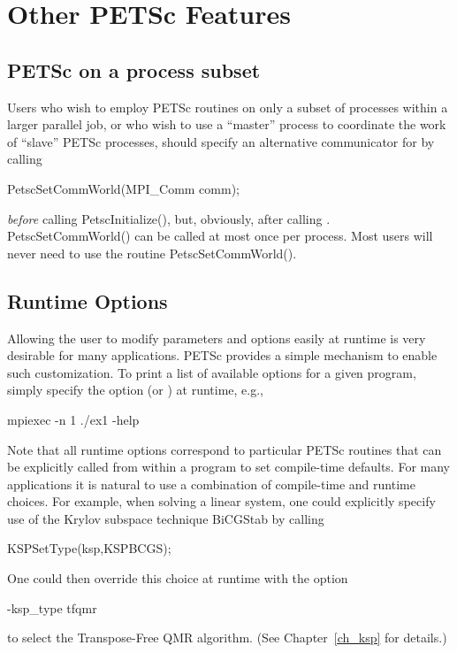 {{%
\cleardoublepage
\chapter{Other PETSc Features}

\section{PETSc on a process subset}

Users who wish to employ PETSc routines on only a subset
of processes within a larger parallel job, or who wish to use a
``master'' process to coordinate the work of ``slave'' PETSc
processes, should specify an alternative communicator for  by calling 
\begin{tabbing}
  PetscSetCommWorld(MPI\_Comm comm);
\end{tabbing}
{\em before} calling PetscInitialize(), but, obviously, after
calling . PetscSetCommWorld() can be called
at most once per process. Most users will never need to use the routine
PetscSetCommWorld().

\section{Runtime Options}  
\label{sec_options}

Allowing the user to modify parameters and options easily at runtime
is very desirable for many applications.  PETSc provides a simple
mechanism to enable such customization.  To print a list of
available options for a given program, simply specify the option 
 (or ) at runtime, e.g.,  
\begin{tabbing}
    mpiexec -n 1 ./ex1 -help
\end{tabbing}

Note that all runtime options correspond to particular PETSc routines
that can be explicitly called from within a program to set compile-time
defaults.   For many applications it is natural to use a combination
of compile-time and runtime choices.  For example, when solving a linear
system, one could explicitly specify use of the Krylov subspace
technique BiCGStab by calling
\begin{tabbing}
   KSPSetType(ksp,KSPBCGS);
\end{tabbing}
One could then override this choice at runtime with the option
\begin{tabbing}
    -ksp\_type tfqmr
\end{tabbing}
to select the Transpose-Free QMR algorithm. (See Chapter~\ref{ch_ksp} for details.)

}}
